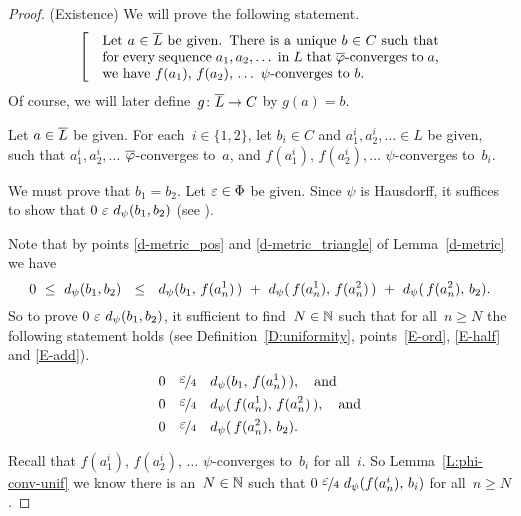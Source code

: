 \documentclass[main.tex]{subfiles}
\begin{document}
\begin{proof}
\vspace{.3em}(Existence)
We will prove the following statement.
\begin{equation}
\label{eq:T-fubext-2}
\left[\quad
\begin{minipage}{.7\columnwidth}
Let $a\in \ol L$ be given.
There is a unique $b\in C$ 
such that for every sequence $a_1,a_2,\dotsc$ in~$L$
that $\ol\varphi$-converges to~$a$,
we have $f(a_1),\,f(a_2),\,\dotsc$
$\psi$-converges to~$b$.
\end{minipage}
\right.
\end{equation}
Of course,
we will later define~$g\colon \overline L \rightarrow C$ by  $g(a) = b$.

Let $a\in\overline L$ be given.
For each~$i\in\{1,2\}$,
let $b_i\in C$
and $a^i_1,a^i_2,\dotsc\in L$
be given,
such that 
$a^i_1,a^i_2,\dotsc$
 $\overline\varphi$-converges to~$a$,
and $f(a^i_1),\,f(a^i_2),\dotsc$
$\psi$-converges to~$b_i$.

We must prove that $b_1=b_2$.
Let $\varepsilon\in\Phi$ be given.
Since $\psi$ is Hausdorff,
it suffices to show that $0\ \ve\ \ld\psi(b_1,b_2)$
(see ).

Note that
by
points \ref{d-metric_pos}
and \ref{d-metric_triangle}
of Lemma~\ref{d-metric}
we have
\begin{equation*}
0 \ \leq\ 
\ld\psi(b_1,b_2)
\ \ \leq\ \ 
\ld\psi(b_1,\,f(a^1_n)\,)
\ +\  
\ld\psi(\,f(a^1_n),\,f(a^2_n)\,)
\ +\ 
\ld\psi(\,f(a^2_n),\,b_2).
\end{equation*}
So to prove 
 $0\ \ve\ \ld\psi(b_1,b_2)$,
it sufficient to find~$N\in\mathbb{N}$
such that for all~$n\geq N$
the following statement holds
(see Definition~\ref{D:uniformity},
points~\ref{E-ord}, \ref{E-half} and \ref{E-add}).
\begin{alignat*}{3}
0\quad &\smash{\nicefrac{\textstyle{\varepsilon}}{4}} \quad d_{\smash{\psi}}(b_1,\,f(a^1_n)\,),
\quad\text{and}\\
0\quad &\smash{\nicefrac{\textstyle{\varepsilon}}{4}} \quad d_{\smash{\psi}}(\,f(a^1_n),\,f(a^2_n)\,),
\quad\text{and}\\
0\quad&\smash{\nicefrac{\textstyle{\varepsilon}}{4}} \quad d_{\smash{\psi}}(\,f(a^2_n),\,b_2).
\end{alignat*}

Recall that $f(a^i_1),\,f(a^i_2),\,\dotsc$
$\psi$-converges to~$b_i$ for all~$i$.
So Lemma~\ref{L:phi-conv-unif}
we know  there is an~$N\in\mathbb{N}$ such that
$0 \ \smash{\nicefrac{\textstyle{\varepsilon}}{4}}\ d_{\smash{\psi}}(f(a^i_n),\,b_i)$
for all~$n\geq N$.


\end{proof}
\end{document}
